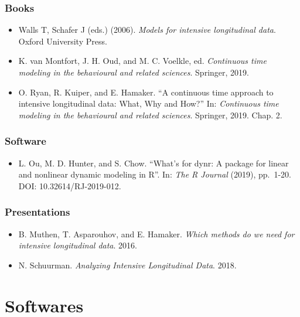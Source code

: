 \documentclass[]{book}
\providecommand{\tightlist}{%
  \setlength{\itemsep}{0pt}\setlength{\parskip}{0pt}}
\begin{document}
\hypertarget{books}{%
\subsection{Books}\label{books}}

\begin{itemize}
\item
  Walls T, Schafer J (eds.) (2006). \emph{Models for intensive longitudinal data}. Oxford University Press.
\item
  K. van Montfort, J. H. Oud, and M. C. Voelkle, ed. \emph{Continuous time modeling in the behavioural and related
  sciences}. Springer, 2019.
\item
  O. Ryan, R. Kuiper, and E. Hamaker. ``A continuous time approach to intensive longitudinal data: What, Why and How?''
  In: \emph{Continuous time modeling in the behavioural and related sciences}. Springer, 2019. Chap. 2.
\end{itemize}

\hypertarget{software}{%
\subsection{Software}\label{software}}

\begin{itemize}
\tightlist
\item
  L. Ou, M. D. Hunter, and S. Chow. ``What's for dynr: A package for linear and nonlinear dynamic modeling in R''. In:
  \emph{The R Journal} (2019), pp.~1-20. DOI: 10.32614/RJ-2019-012.
\end{itemize}

\hypertarget{presentations}{%
\subsection{Presentations}\label{presentations}}

\begin{itemize}
\item
  B. Muthen, T. Asparouhov, and E. Hamaker. \emph{Which methods do we need for intensive longitudinal data}. 2016.
\item
  N. Schuurman. \emph{Analyzing Intensive Longitudinal Data}. 2018.
\end{itemize}

\hypertarget{softwares}{%
\chapter{Softwares}\label{softwares}}
\end{document}

